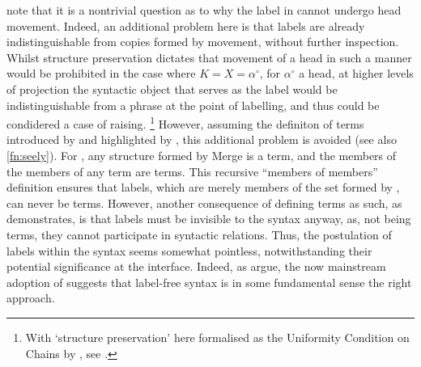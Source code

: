 \textcite[247]{ChomskyN.etal_2019} note that it is a nontrivial question as to why the label in  cannot undergo head movement. Indeed, an additional problem here is that labels are already indistinguishable from copies formed by movement, without further inspection. Whilst structure preservation dictates that movement of a head in such a manner would be prohibited in the case where $K=X=\alpha^{\circ}$, for $\alpha^{\circ}$ a head, at higher levels of projection the syntactic object that serves as the label would be indistinguishable from a phrase at the point of labelling, and thus could be condidered a case of raising.%
\footnote{With `structure preservation' here formalised as the Uniformity Condition on Chains by \textcite[253]{ChomskyN_1995}, see \textcite[f.n.~1]{RobertsI_2001}.}
However, assuming the definiton of terms introduced by \textcite{ChomskyN_1995} and highlighted by \textcite{SeelyTD_2006}, this additional problem is avoided (see also \autoref{fn:seely}). For \textcite{ChomskyN_1995}, any structure formed by Merge is a term, and the members of the members of any term are terms. This recursive ``members of members'' definition ensures that labels, which are merely members of the set formed by , can never be terms. However, another consequence of defining terms as such, as \textcite{SeelyTD_2006} demonstrates, is that labels must be invisible to the syntax anyway, as, not being terms, they cannot participate in syntactic relations. Thus, the postulation of labels within the syntax seems somewhat pointless, notwithstanding their potential significance at the interface. Indeed, as \textcite{CollinsC.SeelyTD_2020} argue, the now mainstream adoption of  suggests that label-free syntax is in some fundamental sense the right approach.


